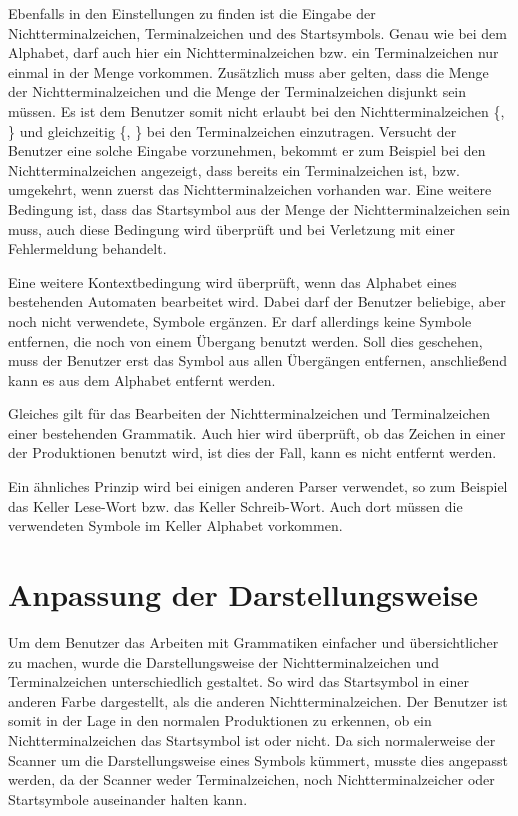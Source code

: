 Ebenfalls in den Einstellungen zu finden ist die Eingabe der
Nichtterminalzeichen, Terminalzeichen und des Startsymbols. Genau wie bei dem
Alphabet, darf auch hier ein Nichtterminalzeichen bzw. ein Terminalzeichen nur
einmal in der Menge vorkommen. Zusätzlich muss aber gelten, dass die Menge der
Nichtterminalzeichen  und die Menge der Terminalzeichen disjunkt sein müssen. Es
ist dem Benutzer somit nicht erlaubt bei den Nichtterminalzeichen
\{, \} und gleichzeitig
\{, \} bei den Terminalzeichen einzutragen.
Versucht der Benutzer eine solche Eingabe vorzunehmen, bekommt er zum Beispiel
bei den Nichtterminalzeichen angezeigt, dass  bereits ein
Terminalzeichen ist, bzw. umgekehrt, wenn zuerst das Nichtterminalzeichen
vorhanden war. Eine weitere Bedingung ist, dass das Startsymbol aus der Menge der
Nichtterminalzeichen sein muss, auch diese Bedingung wird überprüft und bei
Verletzung mit einer Fehlermeldung behandelt.\vspace{10pt}

Eine weitere Kontextbedingung wird überprüft, wenn das Alphabet eines
bestehenden Automaten bearbeitet wird. Dabei darf der Benutzer beliebige, aber
noch nicht verwendete, Symbole ergänzen. Er darf allerdings keine Symbole
entfernen, die noch von einem Übergang benutzt werden. Soll dies geschehen,
muss der Benutzer erst das Symbol aus allen Übergängen entfernen,
anschließend kann es aus dem Alphabet entfernt werden.\vspace{10pt}

Gleiches gilt für das Bearbeiten der Nichtterminalzeichen und Terminalzeichen
einer bestehenden Grammatik. Auch hier wird überprüft, ob das Zeichen in einer
der Produktionen benutzt wird, ist dies der Fall, kann es nicht entfernt werden.

Ein ähnliches Prinzip wird bei einigen anderen Parser verwendet, so zum
Beispiel das Keller Lese-Wort bzw. das Keller Schreib-Wort. Auch dort müssen
die verwendeten Symbole im Keller Alphabet vorkommen.\vspace{10pt}


\section{Anpassung der Darstellungsweise}

Um dem Benutzer das Arbeiten mit Grammatiken einfacher und übersichtlicher zu
machen, wurde die Darstellungsweise der Nichtterminalzeichen und
Terminalzeichen unterschiedlich gestaltet. So wird das Startsymbol in einer
anderen Farbe dargestellt, als die anderen Nichtterminalzeichen. Der Benutzer
ist somit in der Lage in den normalen Produktionen zu erkennen, ob ein
Nichtterminalzeichen das Startsymbol ist oder nicht. Da sich normalerweise der
Scanner um die Darstellungsweise eines Symbols kümmert, musste dies angepasst
werden, da der Scanner weder Terminalzeichen, noch Nichtterminalzeicher oder
Startsymbole auseinander halten kann.\vspace{10pt}

